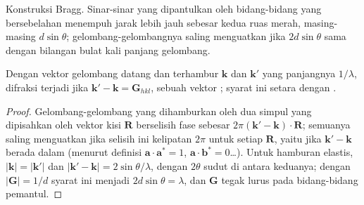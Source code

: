 \begin{omfigure}

{\small Konstruksi Bragg. Sinar-sinar yang dipantulkan oleh bidang-bidang yang
bersebelahan menempuh jarak lebih jauh sebesar kedua ruas merah, masing-masing
$d\sin\theta$; gelombang-gelombangnya saling menguatkan jika $2d\sin\theta$ sama
dengan bilangan bulat kali panjang gelombang.}
\end{omfigure}

\begin{proposition}\label{prop:b3:x-ray-diffraction:laue}
Dengan vektor gelombang datang dan terhambur $\mathbf k$ dan $\mathbf k'$ yang
panjangnya $1/\lambda$, difraksi terjadi jika $\mathbf k' - \mathbf k = \mathbf G_{hkl}$,
sebuah vektor ; syarat ini setara dengan .
\end{proposition}

\begin{proof}
Gelombang-gelombang yang dihamburkan oleh dua simpul yang dipisahkan oleh
vektor kisi $\mathbf R$ berselisih fase sebesar $2\pi(\mathbf k' - \mathbf k)\cdot\mathbf R$;
semuanya saling menguatkan jika selisih ini kelipatan $2\pi$ untuk setiap
$\mathbf R$, yaitu jika $\mathbf k' - \mathbf k$ berada dalam  (menurut
definisi $\mathbf a\cdot\mathbf a^* = 1$, $\mathbf a\cdot\mathbf b^* = 0$\dots). Untuk
hamburan elastis, $|\mathbf k| = |\mathbf k'|$ dan $|\mathbf k' - \mathbf k| = 2\sin\theta/\lambda$,
dengan $2\theta$ sudut di antara keduanya; dengan $|\mathbf G| = 1/d$ syarat ini
menjadi $2d\sin\theta = \lambda$, dan $\mathbf G$ tegak lurus pada bidang-bidang
pemantul.
\end{proof}

